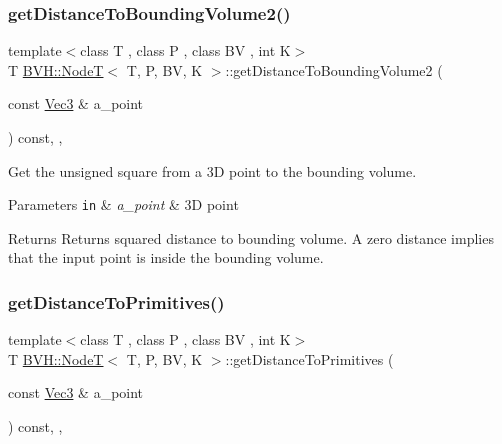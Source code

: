 \subsubsection{\texorpdfstring{get\+Distance\+To\+Bounding\+Volume2()}{getDistanceToBoundingVolume2()}}
{\footnotesize\ttfamily template$<$class T , class P , class BV , int K$>$ \\
T \hyperlink{classBVH_1_1NodeT}{B\+V\+H\+::\+NodeT}$<$ T, P, BV, K $>$\+::get\+Distance\+To\+Bounding\+Volume2 (\begin{DoxyParamCaption}\item[{const \hyperlink{classBVH_1_1NodeT_a6fbb4308c5c55ee170c5f992df7ae1d0}{Vec3} \&}]{a\+\_\+point }\end{DoxyParamCaption}) const\hspace{0.3cm}{\ttfamily [inline]}, {\ttfamily [protected]}, {\ttfamily [noexcept]}}



Get the unsigned square from a 3D point to the bounding volume. 


\begin{DoxyParams}[1]{Parameters}
\mbox{\tt in}  & {\em a\+\_\+point} & 3D point \\
\hline
\end{DoxyParams}
\begin{DoxyReturn}{Returns}
Returns squared distance to bounding volume. A zero distance implies that the input point is inside the bounding volume. 
\end{DoxyReturn}
\mbox{\label{classBVH_1_1NodeT_a61dc7040d57f0a69984548eb4804244b}} 
\subsubsection{\texorpdfstring{get\+Distance\+To\+Primitives()}{getDistanceToPrimitives()}}
{\footnotesize\ttfamily template$<$class T , class P , class BV , int K$>$ \\
T \hyperlink{classBVH_1_1NodeT}{B\+V\+H\+::\+NodeT}$<$ T, P, BV, K $>$\+::get\+Distance\+To\+Primitives (\begin{DoxyParamCaption}\item[{const \hyperlink{classBVH_1_1NodeT_a6fbb4308c5c55ee170c5f992df7ae1d0}{Vec3} \&}]{a\+\_\+point }\end{DoxyParamCaption}) const\hspace{0.3cm}{\ttfamily [inline]}, {\ttfamily [protected]}, {\ttfamily [noexcept]}}



